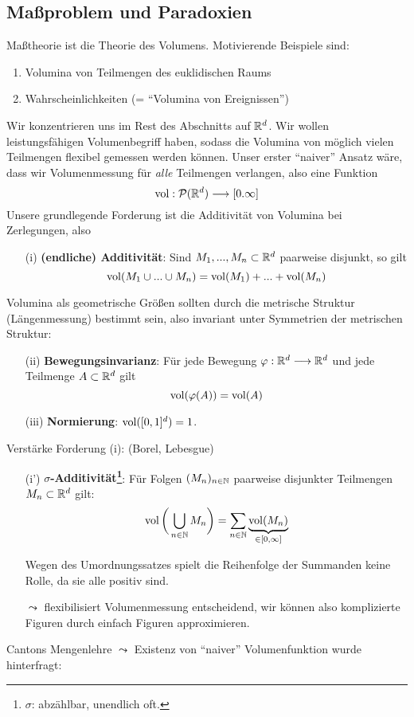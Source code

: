 \subsection{Maßproblem und Paradoxien}
Maßtheorie ist die Theorie des Volumens. Motivierende Beispiele sind:
\begin{enumerate}[label=\roman*),topsep=3pt, itemsep=0pt]
\item Volumina von Teilmengen des euklidischen Raums
\item Wahrscheinlichkeiten (= ``Volumina von Ereignissen'')
\end{enumerate}
Wir konzentrieren uns im Rest des Abschnitts auf $\mathbb{R}^d$. Wir wollen leistungsfähigen Volumenbegriff haben, sodass die Volumina von möglich vielen Teilmengen flexibel gemessen werden können. Unser erster ``naiver'' Ansatz wäre, dass wir Volumenmessung für \emph{alle} Teilmengen verlangen, also eine Funktion
\begin{equation*}
 \operatorname{vol}: \mathcal{P}(\mathbb{R}^d) \longrightarrow [0.\infty]
\end{equation*}
Unsere grundlegende Forderung ist die Additivität von Volumina bei Zerlegungen, also
\begin{enumerate}
\item[(i)] \textbf{(endliche) Additivität}: Sind $M_1,...,M_n\subset \mathbb{R}^d$ paarweise disjunkt, so gilt
\begin{equation*}
\operatorname{vol} (M_1\cup ... \cup M_n) = \operatorname{vol}(M_1)+...+\operatorname{vol} (M_n)
\end{equation*}
\end{enumerate}
Volumina als geometrische Größen sollten durch die metrische Struktur (Längenmessung) bestimmt sein, also invariant unter Symmetrien der metrischen Struktur:
\begin{enumerate}
\item[(ii)] \textbf{Bewegungsinvarianz}: Für jede Bewegung $\varphi: \mathbb{R}^d \longrightarrow \mathbb{R}^d$ und jede Teilmenge $A\subset \mathbb{R}^d$ gilt
\begin{equation*}
\operatorname{vol}(\varphi(A)) = \operatorname{vol} (A)
\end{equation*}
\item[(iii)] \textbf{Normierung}: $\operatorname{vol}([0,1]^d)=1$.
\end{enumerate}
Verstärke Forderung (i): (Borel, Lebesgue)
\begin{enumerate}
\item[(i')]\textbf{$\sigma$-Additivität\footnote{$\sigma$: abzählbar, unendlich oft.}}: Für Folgen $(M_n)_{n\in \mathbb{N}}$ paarweise disjunkter Teilmengen $M_n \subset \mathbb{R}^d$ gilt:
\begin{equation*}
\operatorname{vol}\bigg( \bigcup_{n\in \mathbb{N}} M_n \bigg) = \sum_{n\in \mathbb{N}} \underbrace{\operatorname{vol} (M_n)}_{\in [0,\infty]} 
\end{equation*}
\begin{remark}
Wegen des Umordnungssatzes spielt die Reihenfolge der Summanden keine Rolle, da sie alle positiv sind.
\end{remark}
$\leadsto$ flexibilisiert Volumenmessung entscheidend, wir können also komplizierte Figuren durch einfach Figuren approximieren.
\end{enumerate}
Cantons Mengenlehre $\leadsto$ Existenz von ``naiver'' Volumenfunktion wurde hinterfragt: %
